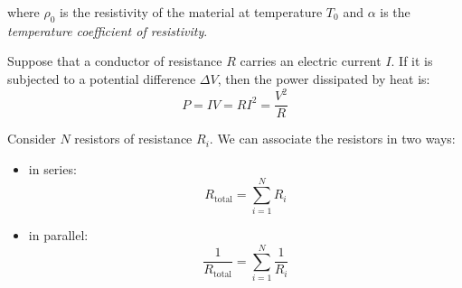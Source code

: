 \documentclass[../../../main.tex]{subfiles}
\begin{document}
\begin{multicols}{2}
\begin{definition}[Resistivity]
    where $\rho_0$ is the resistivity of the material at temperature $T_0$ and $\alpha$ is the \textit{temperature coefficient of resistivity}.
  \end{definition}
  \begin{prop}
    Suppose that a conductor of resistance $R$ carries an electric current $I$. If it is subjected to a potential difference $\Delta V$, then the power dissipated by heat is: $$P=IV=RI^2=\frac{V^2}{R}$$
  \end{prop}
  \begin{prop}
    Consider $N$ resistors of resistance $R_i$. We can associate the resistors in two ways:
    \begin{itemize}
      \item in series: $$R_\text{total}=\sum_{i=1}^NR_i$$
      \item in parallel: $$\frac{1}{R_\text{total}}=\sum_{i=1}^N\frac{1}{R_i}$$
    \end{itemize}
  \end{prop}

\end{multicols}
\end{document}
